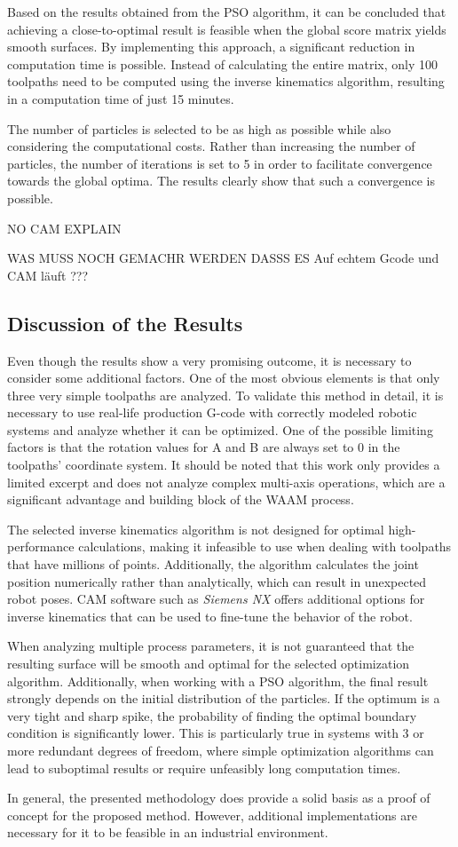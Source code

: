 Based on the results obtained from the \acrshort{PSO} algorithm, it can be concluded that achieving a close-to-optimal result is feasible when the global score matrix yields smooth surfaces. By implementing this approach, a significant reduction in computation time is possible. Instead of calculating the entire matrix, only 100 toolpaths need to be computed using the inverse kinematics algorithm, resulting in a computation time of just 15 minutes.

The number of particles is selected to be as high as possible while also considering the computational costs. Rather than increasing the number of particles, the number of iterations is set to 5 in order to facilitate convergence towards the global optima.
The results clearly show that such a convergence is possible.


NO \acrshort{CAM} EXPLAIN


WAS MUSS NOCH GEMACHR WERDEN DASSS ES Auf echtem Gcode und \acrshort{CAM} läuft ???




\newpage
\subsection{Discussion of the Results}%
Even though the results show a very promising outcome, it is necessary to consider some additional factors. One of the most obvious elements is that only three very simple toolpaths are analyzed. To validate this method in detail, it is necessary to use real-life production G-code with correctly modeled robotic systems and analyze whether it can be optimized. One of the possible limiting factors is that the rotation values for A and B are always set to 0 in the toolpaths' coordinate system. It should be noted that this work only provides a limited excerpt and does not analyze complex multi-axis operations, which are a significant advantage and building block of the \acrshort{WAAM} process.

The selected inverse kinematics algorithm is not designed for optimal high-performance calculations, making it infeasible to use when dealing with toolpaths that have millions of points. Additionally, the algorithm calculates the joint position numerically rather than analytically, which can result in unexpected robot poses. \acrshort{CAM} software such as \textit{Siemens NX} offers additional options for inverse kinematics that can be used to fine-tune the behavior of the robot.

When analyzing multiple process parameters, it is not guaranteed that the resulting surface will be smooth and optimal for the selected optimization algorithm. Additionally, when working with a \acrshort{PSO} algorithm, the final result strongly depends on the initial distribution of the particles. If the optimum is a very tight and sharp spike, the probability of finding the optimal boundary condition is significantly lower. This is particularly true in systems with 3 or more redundant degrees of freedom, where simple optimization algorithms can lead to suboptimal results or require unfeasibly long computation times.

In general, the presented methodology does provide a solid basis as a proof of concept for the proposed method. However, additional implementations are necessary for it to be feasible in an industrial environment.
